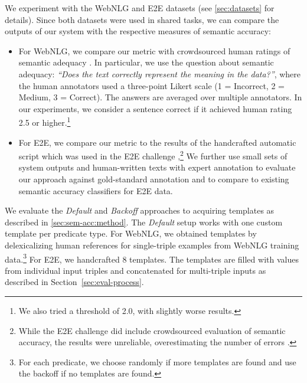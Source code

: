 We experiment with the WebNLG and E2E datasets (see \autoref{sec:datasets} for details). Since both datasets were used in shared tasks, we can compare the outputs of our system with the respective measures of semantic accuracy:
\begin{itemize}
    \item For WebNLG, we compare our metric with crowdsourced human ratings of semantic adequacy \cite{shimorinaWebNLGChallengeHuman2019}. In particular, we use the question about semantic adequacy: \textit{``Does the text correctly represent the meaning in the data?''}, where the human annotators used a three-point Likert scale (1 = Incorrect, 2 = Medium, 3 = Correct). The answers are averaged over multiple annotators. In our experiments, we consider a sentence correct if it achieved human rating 2.5 or higher.\footnote{We also tried a threshold of 2.0, with slightly worse results.}
    \item For E2E, we compare our metric to the results of the handcrafted automatic script which was used in the E2E challenge \cite{dusekEvaluatingStateoftheartEndtoEnd2020},\footnote{While the E2E challenge did include crowdsourced evaluation of semantic accuracy, the results were unreliable, overestimating the number of errors \cite{dusekEvaluatingStateoftheartEndtoEnd2020}.} We further use small sets of system outputs and human-written texts with expert annotation \citep[provided by][]{dusekSemanticNoiseMatters2019} to evaluate our approach against gold-standard annotation and to compare to existing semantic accuracy classifiers for E2E data.
\end{itemize}


We evaluate the \emph{Default} and \emph{Backoff} approaches to acquiring templates as described in \autoref{sec:sem-acc:method}. The \emph{Default} setup works with one custom template per predicate type. For WebNLG, we obtained templates by delexicalizing human references for single-triple examples from WebNLG training data.\footnote{For each predicate, we choose randomly if more templates are found and use the backoff if no templates are found.} For E2E, we handcrafted 8 templates.
The templates are filled with values from individual input triples and concatenated for multi-triple inputs as described in Section~\ref{sec:eval-process}.



